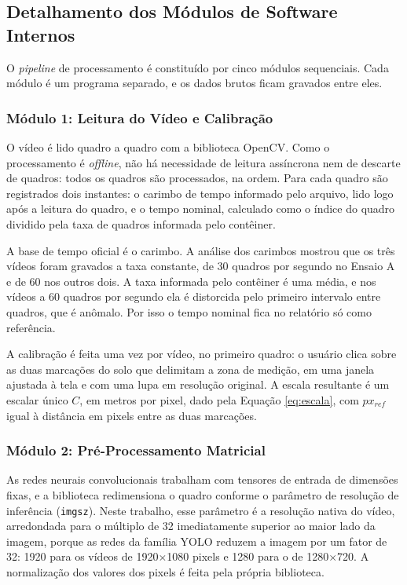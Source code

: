 \documentclass[
    12pt,               %
    openright,          %
    twoside,            %
    a4paper,            %
    chapter=TITLE,      %
    english,            %
    brazil              %
    ]{abntex2}
\begin{document}
\subsection{Detalhamento dos Módulos de Software Internos}

O \textit{pipeline} de processamento é constituído por cinco módulos sequenciais. Cada módulo é um programa separado, e os dados brutos ficam gravados entre eles.

\subsubsection{Módulo 1: Leitura do Vídeo e Calibração}
O vídeo é lido quadro a quadro com a biblioteca OpenCV. Como o processamento é \textit{offline}, não há necessidade de leitura assíncrona nem de descarte de quadros: todos os quadros são processados, na ordem. Para cada quadro são registrados dois instantes: o carimbo de tempo informado pelo arquivo, lido logo após a leitura do quadro, e o tempo nominal, calculado como o índice do quadro dividido pela taxa de quadros informada pelo contêiner.

A base de tempo oficial é o carimbo. A análise dos carimbos mostrou que os três vídeos foram gravados a taxa constante, de 30 quadros por segundo no Ensaio A e de 60 nos outros dois. A taxa informada pelo contêiner é uma média, e nos vídeos a 60 quadros por segundo ela é distorcida pelo primeiro intervalo entre quadros, que é anômalo. Por isso o tempo nominal fica no relatório só como referência.

A calibração é feita uma vez por vídeo, no primeiro quadro: o usuário clica sobre as duas marcações do solo que delimitam a zona de medição, em uma janela ajustada à tela e com uma lupa em resolução original. A escala resultante é um escalar único $C$, em metros por pixel, dado pela Equação \ref{eq:escala}, com $px_{ref}$ igual à distância em pixels entre as duas marcações.

\subsubsection{Módulo 2: Pré-Processamento Matricial}
As redes neurais convolucionais trabalham com tensores de entrada de dimensões fixas, e a biblioteca redimensiona o quadro conforme o parâmetro de resolução de inferência (\texttt{imgsz}). Neste trabalho, esse parâmetro é a resolução nativa do vídeo, arredondada para o múltiplo de 32 imediatamente superior ao maior lado da imagem, porque as redes da família YOLO reduzem a imagem por um fator de 32: 1920 para os vídeos de 1920$\times$1080 pixels e 1280 para o de 1280$\times$720. A normalização dos valores dos pixels é feita pela própria biblioteca.
\end{document}
